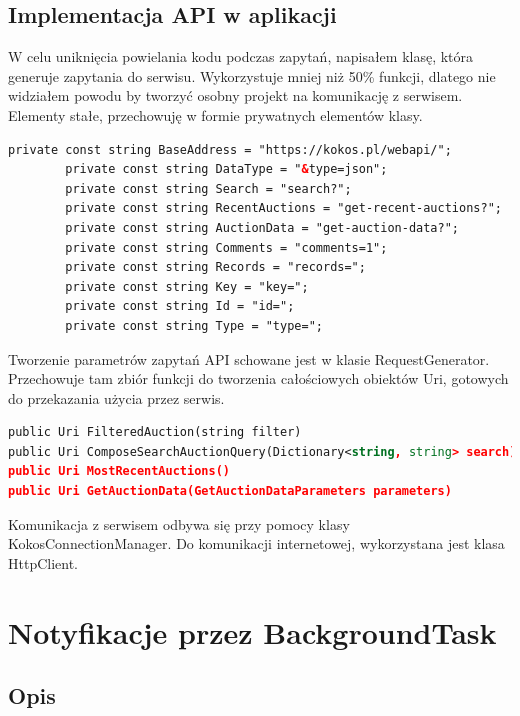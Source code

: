 \documentclass[a4paper,twoside,titlepage,openright]{book}
\begin{document}
\subsection{Implementacja API w aplikacji}

W celu uniknięcia powielania kodu podczas zapytań, napisałem klasę, która generuje zapytania do serwisu. Wykorzystuje mniej niż 50\% funkcji, dlatego nie widziałem powodu by tworzyć osobny projekt na komunikację z serwisem. Elementy stałe, przechowuję w formie prywatnych elementów klasy.

\begin{lstlisting}[caption=Składowe budujące zapytanie do serwisu, label=lst:test, language=xml]
		private const string BaseAddress = "https://kokos.pl/webapi/";
		private const string DataType = "&type=json";
		private const string Search = "search?";
		private const string RecentAuctions = "get-recent-auctions?";
		private const string AuctionData = "get-auction-data?";
		private const string Comments = "comments=1";
		private const string Records = "records=";
		private const string Key = "key=";
		private const string Id = "id=";
		private const string Type = "type=";
\end{lstlisting}


Tworzenie parametrów zapytań API schowane jest w klasie RequestGenerator. Przechowuje tam zbiór funkcji do tworzenia całościowych obiektów Uri, gotowych do przekazania użycia przez serwis.

\begin{lstlisting}[caption=Nagłówki metod pozwalających składać zapytania do serwisu., label=lst:test, language=xml]
public Uri FilteredAuction(string filter)
public Uri ComposeSearchAuctionQuery(Dictionary<string, string> search)
public Uri MostRecentAuctions()
public Uri GetAuctionData(GetAuctionDataParameters parameters)
\end{lstlisting}

Komunikacja z serwisem odbywa się przy pomocy klasy KokosConnectionManager. Do komunikacji internetowej, wykorzystana jest klasa HttpClient.


\section{Notyfikacje przez BackgroundTask}


\subsection{Opis}
\end{document}
